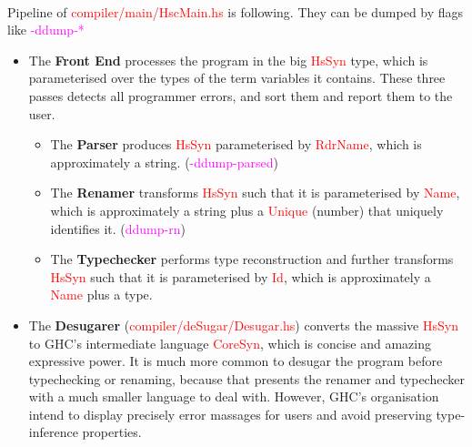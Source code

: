 \documentclass{article}
\begin{document}
	\paragraph{}
	Pipeline of \textcolor{red}{compiler/main/HscMain.hs} is following. They can be dumped by flags like \textcolor{magenta}{-ddump-*}
	\begin{itemize}
		\item The \textbf{Front End} processes the program in the big \textcolor{red}{HsSyn} type, which is parameterised over the types of the term variables it contains. These three passes detects all programmer errors, and sort them and report them to the user.
		\begin{itemize}
			\item The \textbf{Parser} produces \textcolor{red}{HsSyn} parameterised by \textcolor{red}{RdrName}, which is approximately a string. (\textcolor{magenta}{-ddump-parsed})
			\item The \textbf{Renamer} transforms \textcolor{red}{HsSyn} such that it is parameterised by \textcolor{red}{Name}, which is approximately a string plus a \textcolor{red}{Unique} (number) that uniquely identifies it. (\textcolor{magenta}{ddump-rn})
			\item The \textbf{Typechecker} performs type reconstruction and further transforms \textcolor{red}{HsSyn} such that it is parameterised by \textcolor{red}{Id}, which is approximately a \textcolor{red}{Name} plus a type.
		\end{itemize}
		\item The \textbf{Desugarer} (\textcolor{red}{compiler/deSugar/Desugar.hs}) converts the massive \textcolor{red}{HsSyn} to GHC's intermediate language \textcolor{red}{CoreSyn}, which is concise and amazing expressive power. It is much more common to desugar the program before typechecking or renaming, because that presents the renamer and typechecker with a much smaller language to deal with. However, GHC's organisation intend to display precisely error massages for users and avoid preserving type-inference properties.
	\end{itemize}
\end{document}
